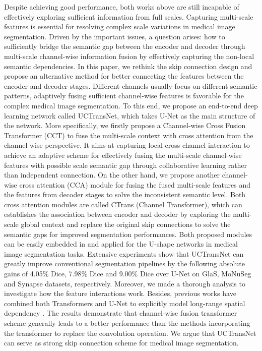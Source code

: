 \documentclass[letterpaper]{article} \usepackage{aaai22}  \usepackage{times}  \usepackage{helvet}  \usepackage{courier}  \usepackage[hyphens]{url}  \usepackage{graphicx} \urlstyle{rm} \def\UrlFont{\rm}  \usepackage{natbib}  \usepackage{caption} \DeclareCaptionStyle{ruled}{labelfont=normalfont,labelsep=colon,strut=off} \frenchspacing  \setlength{\pdfpagewidth}{8.5in}  \setlength{\pdfpageheight}{11in}  \usepackage{algorithm}
\begin{document}
	Despite achieving good performance, both works above are still incapable of effectively exploring sufficient information from full scales.
	Capturing multi-scale features is essential for resolving complex scale variations in medical image segmentation. 
	Driven by the important issues, a question arises: how to sufficiently  bridge the  semantic gap between the encoder and decoder  through multi-scale channel-wise  information fusion by  effectively capturing the non-local semantic dependencies.
	In this paper, we rethink the skip connection design and propose an alternative method for better connecting the features between the encoder and decoder stages.
	Different channels usually focus on different semantic patterns, adaptively fusing sufficient channel-wise features is favorable for the complex medical image segmentation.
	To this end, we propose an end-to-end deep learning network called UCTransNet, which takes U-Net as the main structure of the network. More specifically, we firstly propose a  Channel-wise Cross Fusion Transformer (CCT) to fuse the multi-scale context with cross attention from the channel-wise perspective. It aims at capturing local cross-channel interaction to achieve an adaptive scheme for effectively fusing the multi-scale channel-wise features with possible scale semantic gap through collaborative learning rather than independent connection. 
	On the other hand, we propose another channel-wise cross attention (CCA) module for fusing the fused multi-scale features and the features from decoder stages to solve the inconsistent semantic level.  
	Both cross attention  modules are called CTrans (Channel Transformer), which can establishes the association between encoder and decoder by exploring the multi-scale global context and replace the original skip connections to solve the semantic gaps for improved segmentation performances.
	Both proposed modules can be easily embedded in and applied for the U-shape networks in medical image segmentation tasks.
	Extensive experiments show that UCTransNet can greatly improve conventional segmentation pipelines by the following absolute gains of 4.05\% Dice,  7.98\% Dice  and 9.00\% Dice  over U-Net on GlaS, MoNuSeg and Synapse datasets, respectively. 
	Moreover, we made a thorough analysis to investigate how the feature interactions work. Besides, previous works have combined both Transformers and U-Net to explicitly model long-range spatial dependency \cite{TransUNetTransformersMake_2021,TransFuseFusingTransformers_2021}. The results demonstrate that channel-wise fusion transformer scheme generally leads to a better performance than the methods incorporating the transformer to
	replace the convolution operation.
	We argue that UCTransNet can serve as strong skip connection scheme for medical image segmentation.
	
\end{document}

